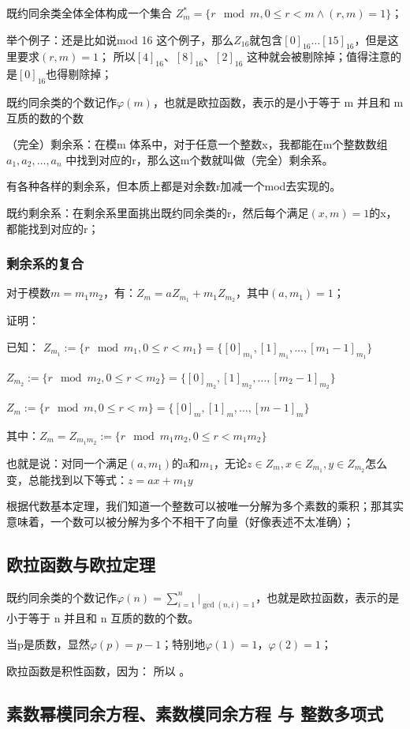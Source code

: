 \documentclass[12pt]{article}
\begin{document}
既约同余类全体全体构成一个集合 $Z^*_m=\{r\mod m,0\leq r<m \land (r,m)=1\}$；

举个例子：还是比如说mod 16 这个例子，那么$Z_{16}$就包含$[0]_{16} \dots [15]_{16}$，但是这里要求$(r,m)=1$；
所以$[4]_{16}$、$[8]_{16}$、$[2]_{16}$ 这种就会被剔除掉；值得注意的是$[0]_{16}$也得剔除掉；

既约同余类的个数记作$\varphi(m)$，也就是欧拉函数，表示的是小于等于 m 并且和 m 互质的数的个数


（完全）剩余系：在模m 体系中，对于任意一个整数x，我都能在m个整数数组 $a_1,a_2,\dots,a_n$ 中找到对应的r，那么这m个数就叫做（完全）剩余系。

有各种各样的剩余系，但本质上都是对余数r加减一个mod去实现的。

既约剩余系：在剩余系里面挑出既约同余类的r，然后每个满足$(x,m)=1$的x，都能找到对应的r；

\subsubsection{剩余系的复合}

对于模数$m=m_1m_2$，有：$Z_m=aZ_{m_1}+m_1Z_{m_2}$，其中$(a,m_1)=1$；

证明：

已知：
$Z_{m_1}:=\{r\mod m_1,0\leq r < m_1\}=\{[0]_{m_1},[1]_{m_1},\dots,[m_1-1]_{m_1}\}$

$Z_{m_2}:=\{r\mod m_2,0\leq r < m_2\}=\{[0]_{m_2},[1]_{m_2},\dots,[m_2-1]_{m_2}\}$

$Z_{m}:=\{r\mod m,0\leq r < m\}=\{[0]_{m},[1]_{m},\dots,[m-1]_{m}\}$

其中：$Z_{m}=Z_{m_1m_2}:=\{r\mod m_1m_2,0\leq r < m_1m_2\}$

也就是说：对同一个满足$(a,m_1)$的a和$m_1$，无论$z\in Z_m,x\in Z_{m_1},y\in Z_{m_2}$怎么变，总能找到以下等式：$z=ax+m_1y$

根据代数基本定理，我们知道一个整数可以被唯一分解为多个素数的乘积；那其实意味着，一个数可以被分解为多个不相干了向量（好像表述不太准确）；

\subsection{欧拉函数与欧拉定理}


既约同余类的个数记作$\varphi(n)=\sum_{i=1}^{n}|_{\gcd(n,i)=1}$，也就是欧拉函数，表示的是小于等于 n 并且和 n 互质的数的个数。

当p是质数，显然$\varphi(p)=p-1$；特别地$\varphi(1)=1$，$\varphi(2)=1$；

欧拉函数是积性函数，因为： 所以 。

\subsection{素数幂模同余方程、素数模同余方程 与 整数多项式}
\end{document}
